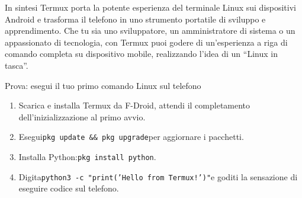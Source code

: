 \begin{tcbinfo}{In sintesi}
Termux porta la potente esperienza del terminale Linux sui dispositivi Android e trasforma il telefono in uno strumento portatile di sviluppo e apprendimento. Che tu sia uno sviluppatore, un amministratore di sistema o un appassionato di tecnologia, con Termux puoi godere di un'esperienza a riga di comando completa su dispositivo mobile, realizzando l'idea di un “Linux in tasca”.

\end{tcbinfo}

\begin{tcbpractice}{Prova: esegui il tuo primo comando Linux sul telefono}
\begin{enumerate}
  \item Scarica e installa Termux da F-Droid, attendi il completamento dell'inizializzazione al primo avvio.
  \item Esegui\texttt{pkg update \&\& pkg upgrade}per aggiornare i pacchetti.
  \item Installa Python:\texttt{pkg install python}.
  \item Digita\texttt{python3 -\allowbreak c "print('Hello from Termux!')"}e goditi la sensazione di eseguire codice sul telefono.
\end{enumerate}

\end{tcbpractice}
